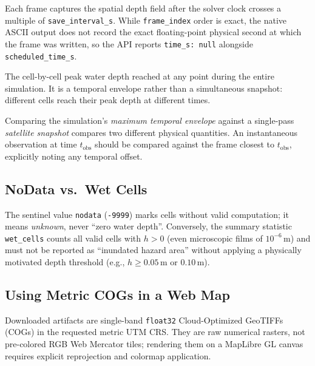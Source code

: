 \documentclass[11pt,a4paper]{article}
\begin{document}
\begin{description}[style=nextline]
  \item[Scheduled Frames (\texttt{frames}).] Each frame captures the spatial depth field after the solver clock crosses a multiple of \texttt{save\_interval\_s}. While \texttt{frame\_index} order is exact, the native ASCII output does not record the exact floating-point physical second at which the frame was written, so the API reports \texttt{time\_s: null} alongside \texttt{scheduled\_time\_s}.
  \item[Maximum Envelope (\texttt{maximum}).] The cell-by-cell peak water depth reached at any point during the entire simulation. It is a temporal envelope rather than a simultaneous snapshot: different cells reach their peak depth at different times.
\end{description}

\begin{cuidado}
Comparing the simulation's \emph{maximum temporal envelope} against a single-pass \emph{satellite snapshot} compares two different physical quantities. An instantaneous observation at time $t_{\text{obs}}$ should be compared against the frame closest to $t_{\text{obs}}$, explicitly noting any temporal offset.
\end{cuidado}

\subsection{NoData vs.\ Wet Cells}

The sentinel value \texttt{nodata} (\texttt{-9999}) marks cells without valid computation; it means \emph{unknown}, never ``zero water depth''. Conversely, the summary statistic \texttt{wet\_cells} counts all valid cells with $h > 0$ (even microscopic films of $10^{-6}$\,m) and must not be reported as ``inundated hazard area'' without applying a physically motivated depth threshold (e.g., $h \ge 0.05$\,m or $0.10$\,m).

\subsection{Using Metric COGs in a Web Map}

Downloaded artifacts are single-band \texttt{float32} Cloud-Optimized GeoTIFFs (COGs) in the requested metric UTM CRS. They are raw numerical rasters, not pre-colored RGB Web Mercator tiles; rendering them on a MapLibre GL canvas requires explicit reprojection and colormap application.
\end{document}
